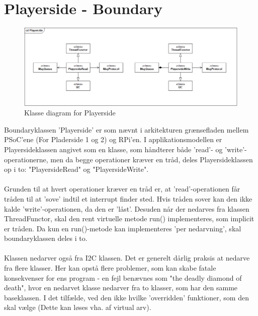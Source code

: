 \documentclass[Softwaredesign/Softwaredesign_main.tex]{subfiles}
\begin{document}
\section{Playerside - Boundary}
\begin{figure}[H]
    \centering
    \includegraphics[width=1\textwidth]{Softwaredesign/RPiApp/graphic_RPi/PS.png}
    \caption{Klasse diagram for Playerside}
   \label{fig:cd_PS}
\end{figure}
Boundaryklassen 'Playerside' er som nævnt i arkitekturen grænsefladen mellem PSoC'ene (For Pladerside 1 og 2) og RPi'en. I applikationsmodellen er Playersideklassen angivet som en klasse, som håndterer både 'read'- og 'write'-operationerne, men da begge operationer kræver en tråd, deles Playersideklassen op i to: "PlayersideRead" og "PlayersideWrite". 
\\\\Grunden til at hvert operationer kræver en tråd er, at 'read'-operationen får tråden til at 'sove' indtil et interrupt finder sted. Hvis tråden sover kan den ikke kalde 'write'-operationen, da den er 'låst'. Desuden når der nedarves fra klassen ThreadFunctor, skal den rent virtuelle metode run() implementeres, som implicit er tråden. Da kun en run()-metode kan implementeres 'per nedarvning', skal boundaryklassen deles i to. \\\\
Klassen nedarver også fra I2C klassen. Det er generelt dårlig praksis at nedarve fra flere klasser. Her kan opstå flere problemer, som kan skabe fatale konsekvenser for ens program - en fejl benævnes som "the deadly diamond of death", hvor en nedarvet klasse nedarver fra to klasser, som har den samme baseklassen. I det tilfælde, ved den ikke hvilke 'overridden' funktioner, som den skal vælge (Dette kan løses vha. af virtual arv). 
\end{document}
